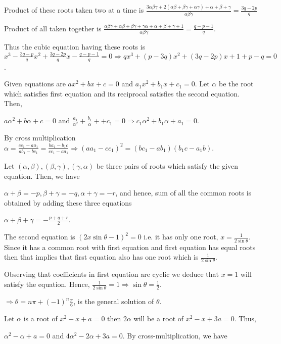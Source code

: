   Product of these roots taken two at a time is $\frac{3\alpha\beta\gamma + 2(\alpha\beta + \beta\gamma +
    \alpha\gamma) + \alpha + \beta + \gamma}{\alpha\beta\gamma} = \frac{3q - 2p}{q}$

  Product of all taken together is $\frac{\alpha\beta\gamma + \alpha\beta + \beta\gamma + \gamma\alpha +
    \alpha + \beta + \gamma + 1}{\alpha\beta\gamma} = \frac{q - p - 1}{q}$.

  Thus the cubic equation having these roots is $x^3 - \frac{3q - p}{q}x^2 + \frac{3q - 2p}{q}x - \frac{q -
    p - 1}{q} = 0 \Rightarrow qx^3 + (p - 3q)x^2 + (3q - 2p)x + 1 + p - q = 0$.
\item Given equations are $ax^2 + bx + c = 0$ and $a_1x^2 + b_1x + c_1 = 0$. Let $\alpha$ be the root which
  satisfies first equation and its reciprocal satisfies the second equation. Then,

  $a\alpha^2 + b\alpha + c = 0$ and $\frac{a_1}{\alpha^2} + \frac{b_1}{\alpha} ++ c_1 = 0 \Rightarrow
  c_1\alpha^2 + b_1\alpha + a_1 = 0$.

  By cross multiplication $\alpha = \frac{cc_1 - aa_1}{ab_1 - bc_1} = \frac{ba_1 - b_1c}{cc_1 - aa_1}
  \Rightarrow (aa_1 - cc_1)^2 = (bc_1 - ab_1)(b_1c - a_1b)$.
\item Let $(\alpha, \beta), (\beta, \gamma), (\gamma, \alpha)$ be three pairs of roots which satisfy the
  given equation. Then, we have

  $\alpha + \beta = -p, \beta + \gamma = -q, \alpha + \gamma = -r$, and hence, sum of all the common roots is
  obtained by adding these three equations

  $\alpha + \beta + \gamma = -\frac{p + q + r}{2}$.
\item The second equation is $(2x\sin\theta - 1)^2 = 0$ i.e. it has only one root, $x =
  \frac{1}{2\sin\theta}$. Since it has a common root with first equation and first equation has equal roots
  then that implies that first equation also has one root which is $\frac{1}{2\sin\theta}$.

  Observing that coefficients in first equation are cyclic we deduce that $x = 1$ will satisfy the
  equation. Hence, $\frac{1}{2\sin\theta} = 1 \Rightarrow \sin\theta = \frac{1}{2}$.

  $\Rightarrow \theta = n\pi + (-1)^n\frac{\pi}{6}$, is the general solution of $\theta$.
\item Let $\alpha$ is a root of $x^2 - x + a = 0$ then $2\alpha$ will be a root of $x^2 - x + 3a= 0$. Thus,

  $\alpha^2 - \alpha + a = 0$ and $4\alpha^2 - 2\alpha + 3a = 0$. By cross-multiplication, we have

